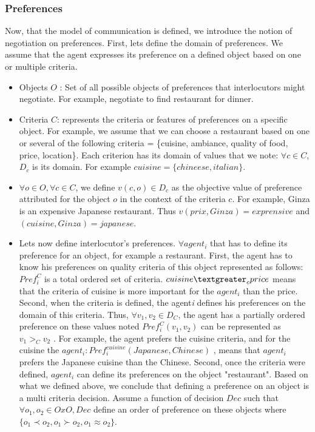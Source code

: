 \documentclass{llncs}
\begin{document}
\subsubsection{Preferences}
\par Now, that  the model of communication is defined, we introduce the notion of negotiation on preferences. First, lets define the domain of preferences. We assume that the agent expresses its preference on a defined object based on one or multiple criteria.   
 \begin{itemize}
 \item Objects $O$ : Set of all possible objects of preferences that interlocutors might negotiate. For example, negotiate to find restaurant for dinner.
 \item Criteria $C$: represents the criteria or features of preferences on a specific object. For example, we assume that we can choose a restaurant based on one or several of the following criteria = \{cuisine, ambiance, quality of food, price, location\}. Each criterion has its domain of values that we note: $\forall c \in C$, $D_{c}$ is its domain. For example $cuisine = \{chineese, italian\}$.

 \item $\forall o \in O, \forall c \in C$, we define $v(c,o) \in D_{c}$ as the objective value of preference attributed for the object $o$ in the context of the criteria $c$. For example, Ginza is an expensive Japanese restaurant. Thus $v(prix, Ginza) = exprensive$ and $(cuisine, Ginza) = japanese$. 
 
 \item Lets now define interlocutor's preferences. $\forall agent_{i}$ that has to define its preference for an object, for example a restaurant. First, the agent has to know his preferences on quality criteria of this object represented as follows: 
 $Pref_{i}^C $ is a total ordered set of criteria.   $ cuisine \textgreater _{c} price$ means that the criteria of cuisine is more important for the $agent_{i}$  than the price. Second, when the criteria is defined, the agent\emph{i} defines his preferences on the domain of this criteria. Thus, $\forall v_{1} , v_{2} \in D_{C}$, the agent has a  partially ordered preference on these values noted $Pref_{i}^C (v_{1}, v_{2})$  can be represented as $v_{1}>_{C} v_{2}$ . For example, the agent prefers the cuisine criteria, and for the cuisine the $agent_{i}:  Pref_{i}^{cuisine} (Japanese , Chinese)$ , means that  $agent_{i}$ prefers the Japanese cuisine than the Chinese.  Second, once the criteria were defined, $agent_{i}$ can define its preferences on the object "restaurant". Based on what we defined above, we conclude that defining a preference on an object is a multi criteria decision. Assume a function of decision  $Dec$ such that $\forall o_{1}, o_{2} \in O x O, Dec$ define an order of preference on these objects where  $\{o_{1}\prec o_{2}, o_{1} \succ o_{2}, o_{1} \approx o_{2}\}$.   
 \end{itemize}
\end{document}
